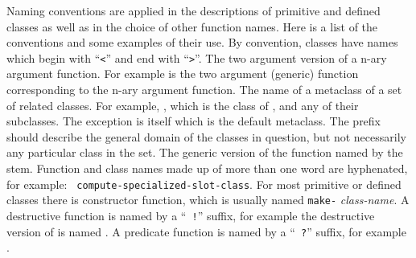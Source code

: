 %
\begin{optDefinition}
Naming conventions are applied in the descriptions of primitive and
defined classes as well as in the choice of other function names.
Here is a list of the conventions and some examples of their use.
%
 By convention, classes have names
which begin with ``{\tt <}'' and end with ``{\tt >}''.
%
 The two argument version of a n-ary
argument function.  For example  is the two argument
(generic) function corresponding to the n-ary argument \functionref{+} function.
%
 The name of a metaclass of a set of
related classes.  For example, , which is the class of
,  and any of their
subclasses.  The exception is  itself which is the default
metaclass.  The prefix should describe the general domain of the classes in
question, but not necessarily any particular class in the set.
%
 The generic version of the function
named by the stem.
%
 Function and class names made up of more than one
word are hyphenated, for example: {\tt
    compute-specialized-slot-class}.
%
 For most primitive or defined classes
there is constructor function, which is usually named {\tt make-}{\em
    class-name}.
%
 A destructive function is named by a ``{\tt
    !}'' suffix, for example the destructive version of  is
named .
%
 A predicate function is named by a ``{\tt
    ?}'' suffix, for example .

\end{optDefinition}

